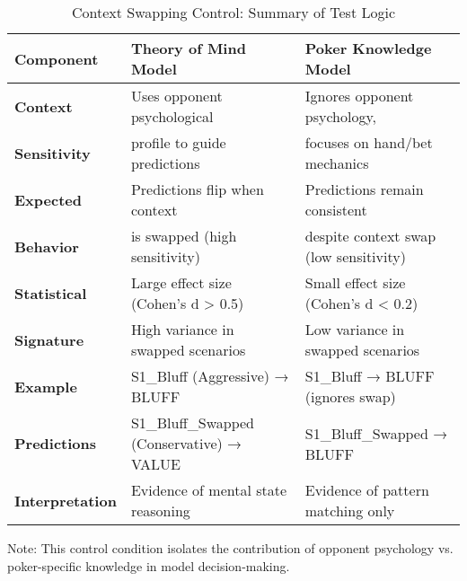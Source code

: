 
\begin{table}[htbp]
\centering
\caption{Context Swapping Control: Summary of Test Logic}
\label{tab:control_logic}
\begin{tabular}{@{}p{3cm}p{5cm}p{5cm}@{}}
\toprule
\textbf{Component} & \textbf{Theory of Mind Model} & \textbf{Poker Knowledge Model} \\
\midrule
\textbf{Context} & Uses opponent psychological & Ignores opponent psychology, \\
\textbf{Sensitivity} & profile to guide predictions & focuses on hand/bet mechanics \\
\addlinespace
\textbf{Expected} & Predictions flip when context & Predictions remain consistent \\
\textbf{Behavior} & is swapped (high sensitivity) & despite context swap (low sensitivity) \\
\addlinespace
\textbf{Statistical} & Large effect size (Cohen's d > 0.5) & Small effect size (Cohen's d < 0.2) \\
\textbf{Signature} & High variance in swapped scenarios & Low variance in swapped scenarios \\
\addlinespace
\textbf{Example} & S1\_Bluff (Aggressive) → BLUFF & S1\_Bluff → BLUFF (ignores swap) \\
\textbf{Predictions} & S1\_Bluff\_Swapped (Conservative) → VALUE & S1\_Bluff\_Swapped → BLUFF \\
\addlinespace
\textbf{Interpretation} & Evidence of mental state reasoning & Evidence of pattern matching only \\
\bottomrule
\end{tabular}
\begin{tablenotes}
\small
\item Note: This control condition isolates the contribution of opponent psychology
vs. poker-specific knowledge in model decision-making.
\end{tablenotes}
\end{table}
